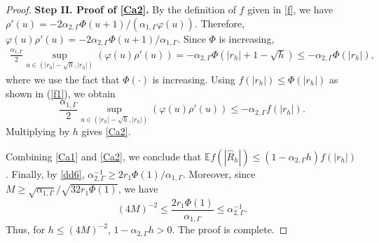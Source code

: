\documentclass[aap]{imsart}
\theoremstyle{plain}
\theoremstyle{definition}
\begin{document}
\begin{proof}
{\bf Step II. Proof of \eqref{Ca2}.} By the definition of \(f\) given in \eqref{f}, we have $\rho'(u) = -2\alpha_{2, \Gamma}\Phi(u+1)/(\alpha_{1, \Gamma}\varphi(u))$. Therefore, \(\varphi(u)\rho'(u)=-2\alpha_{2,\Gamma}
\Phi(u+1)/\alpha_{1,\Gamma}\). Since \(\Phi\) is increasing,
\begin{align*}
\frac{\alpha_{1, \Gamma}}{2}\sup_{u\in(|r_h|-\sqrt{h},|r_h|)}(\varphi(u)\rho'(u))
= -\alpha_{2, \Gamma}\Phi(|r_h|+1-\sqrt{h})\leqslant-\alpha_{2, \Gamma}\Phi(|r_h|),
\end{align*}
where we use the fact that $\Phi(\cdot)$ is increasing. 
Using $f(|r_h|)\leqslant \Phi(|r_h|)$ as shown in (\ref{f1}), we obtain
$$\frac{\alpha_{1, \Gamma}}{2}\sup_{u\in(|r_h|-\sqrt{h}, |r_h|)}(\varphi(u)\rho'(u))\leqslant -\alpha_{2, \Gamma}f(|r_h|).$$
Multiplying by \(h\) gives \eqref{Ca2}.

Combining \eqref{Ca1} and \eqref{Ca2}, we conclude that \(\mathbb E f(|\hat R_h|)
\leqslant (1-\alpha_{2,\Gamma}h)f(|r_h|)\).				
Finally, by \eqref{dd6}, $\alpha_{2, \Gamma}^{-1}\geqslant 2r_1\Phi(1)/\alpha_{1, \Gamma}$. Moreover, since $M\geqslant \sqrt{\alpha_{1, \Gamma}}/\sqrt{32r_1\Phi(1)}$, we have \[(4M)^{-2}\leqslant \frac{2r_1\Phi(1)}{\alpha_{1, \Gamma}} \leqslant \alpha_{2, \Gamma}^{-1}.\] 
Thus, for \(h\leqslant (4M)^{-2}\), $1-\alpha_{2, \Gamma}h>0$. The proof is complete.	
\end{proof}
			
\end{document}
